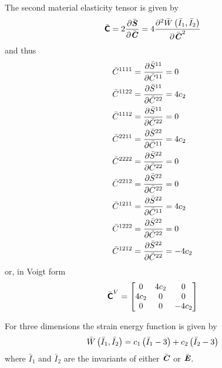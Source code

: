 The second material elasticity tensor is given by
\begin{equation}
  \bar{\boldsymbol{\mathsf{C}}}=2 \dfrac{\partial \bar{\boldsymbol{\mathit{S}}}}{\partial \bar{\boldsymbol{\mathit{C}}}} =4 \dfrac{\partial^{2}  \bar{W}\left( \bar{I}_{1},\bar{I}_{2} \right) }{\partial {\bar{\ensuremath{\boldsymbol{\mathit{C}}}}}^{2}} \\
\end{equation}
and thus
\begin{equation}
  \begin{split}
    \bar{C}^{1111}&= \dfrac{\partial \bar{S}^{11}}{\partial \bar{C}^{11}} =0\\
    \bar{C}^{1122}&= \dfrac{\partial \bar{S}^{11}}{\partial \bar{C}^{22}} =4c_{2}\\
    \bar{C}^{1112}&= \dfrac{\partial \bar{S}^{11}}{\partial \bar{C}^{22}} =0\\
    \bar{C}^{2211}&= \dfrac{\partial \bar{S}^{22}}{\partial \bar{C}^{11}} =4c_{2}\\
    \bar{C}^{2222}&= \dfrac{\partial \bar{S}^{22}}{\partial \bar{C}^{22}} =0\\
    \bar{C}^{2212}&= \dfrac{\partial \bar{S}^{22}}{\partial \bar{C}^{22}} =0\\
    \bar{C}^{1211}&= \dfrac{\partial \bar{S}^{22}}{\partial \bar{C}^{11}} =4c_{2}\\
    \bar{C}^{1222}&= \dfrac{\partial \bar{S}^{22}}{\partial \bar{C}^{22}} =0\\
    \bar{C}^{1212}&= \dfrac{\partial \bar{S}^{22}}{\partial \bar{C}^{22}} =-4c_{2}\\
  \end{split}
\end{equation}
or, in Voigt form
\begin{equation}
  \bar{\boldsymbol{\mathsf{C}}}^{V}=\begin{bmatrix}
  0 & 4c_{2} & 0 \\
  4c_{2} & 0 & 0 \\
  0 & 0 & -4c_{2}
  \end{bmatrix}
\end{equation}

For three dimensions the strain energy function is given by
\begin{equation}
   \bar{W}\left( \bar{I}_{1},\bar{I}_{2} \right) =c_{1}\left( \bar{I}_{1}-3 \right)+c_{2}\left( \bar{I}_{2}-3 \right)
\end{equation}
where $\bar{I}_{1}$ and $\bar{I}_{2}$ are the invariants of either $\bar{\boldsymbol{\mathit{C}}}$ or $\bar{\boldsymbol{\mathit{E}}}$.

